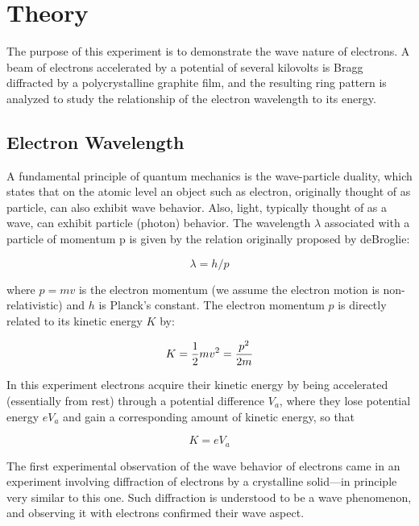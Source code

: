 \section{Theory}

The purpose of this experiment is to demonstrate the wave nature
of electrons. A beam of electrons accelerated by a potential of several kilovolts is Bragg
diffracted by a polycrystalline graphite film, and the resulting ring pattern is analyzed to study the
relationship of the electron wavelength to its energy.

\subsection{Electron Wavelength}

A fundamental principle of quantum mechanics is the wave-particle
duality, which states that on the atomic level an object such as
electron, originally thought of as particle, can also exhibit wave
behavior.  Also, light, typically thought of as a wave, can exhibit
particle (photon) behavior.  The wavelength $\lambda$ associated
with a particle of momentum p is given by the relation originally
proposed by deBroglie:

\begin{equation}
\lambda = h/p
\label{eq:debroglie}
\end{equation}

where $p = mv$ is the electron momentum (we assume the electron motion is
non-relativistic) and $h$ is Planck's constant.  The
electron momentum $p$ is directly related to its kinetic energy $K$ by:


\begin{equation}
K = {1 \over 2} mv^2 = {p^2 \over 2m}
\label{eq:ke}
\end{equation}

In this experiment electrons acquire their kinetic energy by being
accelerated (essentially from rest) through a potential difference
$V_a$, where they lose potential energy
$eV_a$ and gain a corresponding amount of kinetic energy,
so that

\begin{equation}
K = eV_a
\label{eq:kev}
\end{equation}

The first experimental observation of the wave behavior of electrons
came in an experiment involving diffraction of electrons by a
crystalline solid---in principle very similar to this one. Such
diffraction is understood to be a wave phenomenon, and observing it
with electrons confirmed their wave aspect.

